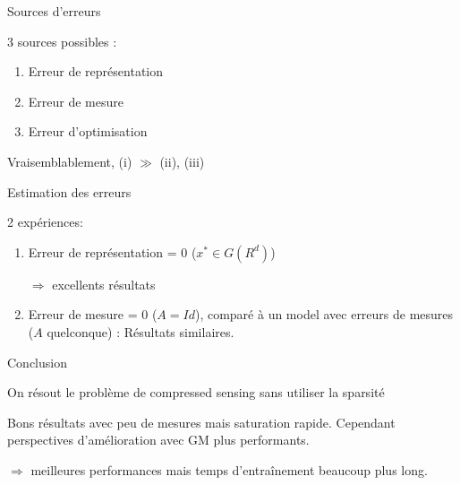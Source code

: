 \documentclass{beamer}
\begin{document}
\begin{frame}{Sources d'erreurs}

3 sources possibles :

\begin{enumerate}[label=(\roman*)]
    \item Erreur de représentation
    \item Erreur de mesure
    \item Erreur d'optimisation
\end{enumerate}



\vspace{2em}
Vraisemblablement, (i) $ \gg$ (ii), (iii)
    
\end{frame}


\begin{frame}{Estimation des erreurs}

2 expériences:
\begin{enumerate}[label=(\Roman*)]
    \item Erreur de représentation = 0 ($x^* \in G(R^d)$) 
    
    $\Rightarrow$ excellents résultats
    \item Erreur de mesure = 0 ($A = Id$), comparé à un model avec erreurs de mesures ($A$ quelconque) : Résultats similaires.
\end{enumerate}
    
\end{frame}


\begin{frame}{Conclusion}

On résout le problème de compressed sensing sans utiliser la sparsité

\vspace{2em}

Bons résultats avec peu de mesures mais saturation rapide. Cependant perspectives d'amélioration avec GM plus performants.

\vspace{2em}
$\Rightarrow$ meilleures performances mais temps d'entraînement beaucoup plus long.
    
\end{frame}
\end{document}
